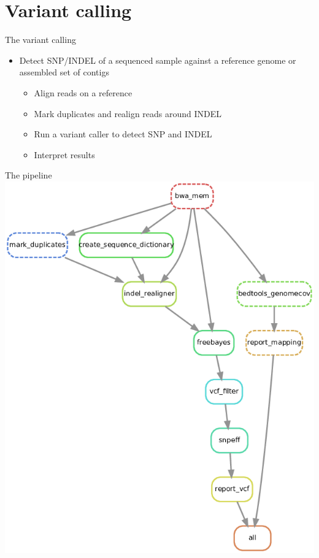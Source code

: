 \documentclass{beamer}
\begin{document}
\section{Variant calling}

\begin{frame}{The variant calling}
    \begin{itemize}
        \item Detect SNP/INDEL of a sequenced sample against a reference genome 
            or assembled set of contigs
        \begin{itemize}
            \item Align reads on a reference
            \item Mark duplicates and realign reads around INDEL
            \item Run a variant caller to detect SNP and INDEL
            \item Interpret results
        \end{itemize}
    \end{itemize}
\end{frame}

\begin{frame}{The pipeline}
    \center
    \includegraphics[scale=0.28]{images/variant_calling_dag}
\end{frame}
\end{document}

